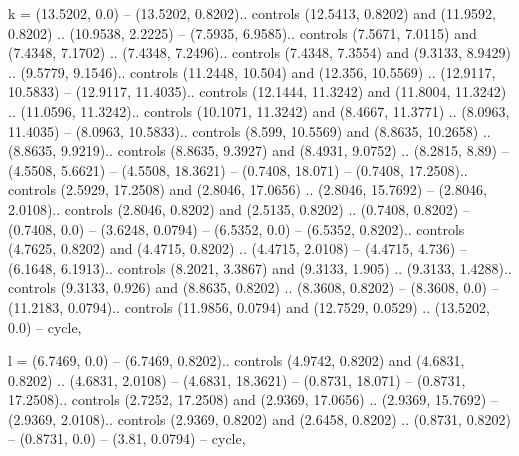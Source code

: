 k = {(13.5202, 0.0) -- (13.5202, 0.8202).. controls (12.5413, 0.8202) and (11.9592, 0.8202) .. (10.9538, 2.2225) -- (7.5935, 6.9585).. controls (7.5671, 7.0115) and (7.4348, 7.1702) .. (7.4348, 7.2496).. controls (7.4348, 7.3554) and (9.3133, 8.9429) .. (9.5779, 9.1546).. controls (11.2448, 10.504) and (12.356, 10.5569) .. (12.9117, 10.5833) -- (12.9117, 11.4035).. controls (12.1444, 11.3242) and (11.8004, 11.3242) .. (11.0596, 11.3242).. controls (10.1071, 11.3242) and (8.4667, 11.3771) .. (8.0963, 11.4035) -- (8.0963, 10.5833).. controls (8.599, 10.5569) and (8.8635, 10.2658) .. (8.8635, 9.9219).. controls (8.8635, 9.3927) and (8.4931, 9.0752) .. (8.2815, 8.89) -- (4.5508, 5.6621) -- (4.5508, 18.3621) -- (0.7408, 18.071) -- (0.7408, 17.2508).. controls (2.5929, 17.2508) and (2.8046, 17.0656) .. (2.8046, 15.7692) -- (2.8046, 2.0108).. controls (2.8046, 0.8202) and (2.5135, 0.8202) .. (0.7408, 0.8202) -- (0.7408, 0.0) -- (3.6248, 0.0794) -- (6.5352, 0.0) -- (6.5352, 0.8202).. controls (4.7625, 0.8202) and (4.4715, 0.8202) .. (4.4715, 2.0108) -- (4.4715, 4.736) -- (6.1648, 6.1913).. controls (8.2021, 3.3867) and (9.3133, 1.905) .. (9.3133, 1.4288).. controls (9.3133, 0.926) and (8.8635, 0.8202) .. (8.3608, 0.8202) -- (8.3608, 0.0) -- (11.2183, 0.0794).. controls (11.9856, 0.0794) and (12.7529, 0.0529) .. (13.5202, 0.0) -- cycle},

l = {(6.7469, 0.0) -- (6.7469, 0.8202).. controls (4.9742, 0.8202) and (4.6831, 0.8202) .. (4.6831, 2.0108) -- (4.6831, 18.3621) -- (0.8731, 18.071) -- (0.8731, 17.2508).. controls (2.7252, 17.2508) and (2.9369, 17.0656) .. (2.9369, 15.7692) -- (2.9369, 2.0108).. controls (2.9369, 0.8202) and (2.6458, 0.8202) .. (0.8731, 0.8202) -- (0.8731, 0.0) -- (3.81, 0.0794) -- cycle},


